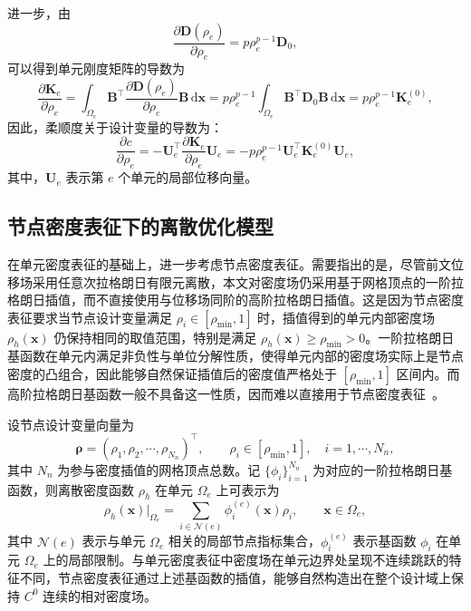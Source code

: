 进一步，由
\[
\frac{\partial \boldsymbol D(\rho_e)}{\partial \rho_e} = p\rho_e^{p-1}\boldsymbol D_0,
\]
可以得到单元刚度矩阵的导数为
\[
\frac{\partial\boldsymbol{K}_e}{\partial\rho_e} = \int_{\Omega_e}\boldsymbol{B}^{\top}\frac{\partial\boldsymbol{D}(\rho_e)}{\partial\rho_e}\boldsymbol{B}\,\mathrm{d}\boldsymbol{x} = p\rho_e^{p-1}\int_{\Omega_e}\boldsymbol{B}^{\top}\boldsymbol{D}_0\boldsymbol{B}\,\mathrm{d}\boldsymbol{x} = p\rho_e^{p-1}\boldsymbol{K}_e^{(0)},
\]
因此，柔顺度关于设计变量的导数为：
\begin{equation} \label{eq:ch3_sens_cell_compliance}
	\frac{\partial{c}}{\partial\rho_e} = -\boldsymbol{U}_e^{\top}\frac{\partial\boldsymbol{K}_e}{\partial\rho_e}\boldsymbol{U}_e = -p\rho_e^{p-1}\boldsymbol{U}_e^{\top}\boldsymbol{K}_e^{(0)}\boldsymbol{U}_e,
\end{equation}
其中，$\boldsymbol{U}_e$ 表示第 $e$ 个单元的局部位移向量。


\subsection{节点密度表征下的离散优化模型}
\label{subsec:node_density_rep}

在单元密度表征的基础上，进一步考虑节点密度表征。需要指出的是，尽管前文位移场采用任意次拉格朗日有限元离散，本文对密度场仍采用基于网格顶点的一阶拉格朗日插值，而不直接使用与位移场同阶的高阶拉格朗日插值。这是因为节点密度表征要求当节点设计变量满足 $\rho_i\in[\rho_{\min},1]$ 时，插值得到的单元内部密度场 $\rho_h(\boldsymbol{x})$ 仍保持相同的取值范围，特别是满足 $\rho_h(\boldsymbol{x})\ge \rho_{\min}>0$。一阶拉格朗日基函数在单元内满足非负性与单位分解性质，使得单元内部的密度场实际上是节点密度的凸组合，因此能够自然保证插值后的密度值严格处于 $[\rho_{\min}, 1]$ 区间内。而高阶拉格朗日基函数一般不具备这一性质，因而难以直接用于节点密度表征~\cite{kangNodalVariableMethod2012a}。

设节点设计变量向量为
\[
\boldsymbol{\rho}=(\rho_1,\rho_2,\cdots,\rho_{N_n})^{\top},\qquad \rho_i\in[\rho_{\min},1],\quad i=1,\cdots,N_n,
\]
其中 $N_n$ 为参与密度插值的网格顶点总数。记 $\{\phi_i\}_{i=1}^{N_n}$ 为对应的一阶拉格朗日基函数，则离散密度函数 $\rho_h$ 在单元 $\Omega_e$ 上可表示为
\[
\rho_h(\boldsymbol{x})\big|_{\Omega_e} = \sum_{i\in\mathcal N(e)}\phi_i^{(e)}(\boldsymbol{x})\rho_i, \qquad \boldsymbol{x}\in\Omega_e,
\]
其中 $\mathcal N(e)$ 表示与单元 $\Omega_e$ 相关的局部节点指标集合，$\phi_i^{(e)}$ 表示基函数 $\phi_i$ 在单元 $\Omega_e$ 上的局部限制。与单元密度表征中密度场在单元边界处呈现不连续跳跃的特征不同，节点密度表征通过上述基函数的插值，能够自然构造出在整个设计域上保持 $C^0$ 连续的相对密度场。

